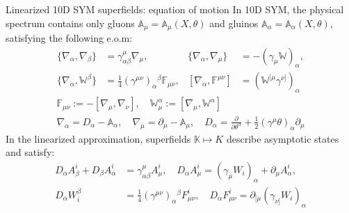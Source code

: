 \documentclass{beamer}
\begin{document}
\begin{frame}{Linearized 10D SYM superfields: equation of motion}\label{10d sym}
	In 10D SYM, the physical spectrum contains only gluons 
	$\mathbb{A}_\mu=\mathbb{A}_\mu(X,\theta)$ and gluinos 
	$\mathbb{A}_\alpha=\mathbb{A}_\alpha(X,\theta)$, satisfying the following e.o.m:
	\begin{equation*}
		\begin{aligned}
			\{\nabla_{\alpha},\nabla_{\beta}\}&=\gamma_{\alpha\beta}^{\mu}\nabla_{\mu},&\{\nabla_{\alpha},\nabla_{\mu}\}&=-(\gamma_{\mu}\mathbb{W})_{\alpha},\\
			\{\nabla_{\alpha},\mathbb{W}^{\beta}\}&=\frac{1}{4}(\gamma^{\mu\nu})_\alpha{}^\beta\mathbb{F}_{\mu\nu},&[\nabla_\alpha,\mathbb{F}^{\mu\nu}]&=(\mathbb{W}^{[\mu}\gamma^{\nu]})_\alpha
		\end{aligned}
	\end{equation*}
	\begin{equation*}
		\begin{gathered}
			\mathbb{F}_{\mu\nu}:=-\left[\nabla_\mu,\nabla_\nu\right],\quad\mathbb{W}_\mu^\alpha:=\left[\nabla_\mu,\mathbb{W}^\alpha\right]\\
			\nabla_{\alpha}=D_{\alpha}-\mathbb{A}_{\alpha},\quad\nabla_{\mu}=\partial_{\mu}-\mathbb{A}_{\mu},\quad D_{\alpha}=\frac{\partial}{\partial\theta^{\alpha}}+\frac{1}{2}(\gamma^{\mu}\theta)_{\alpha}\partial_{\mu}
		\end{gathered}
	\end{equation*}
	In the linearized approximation, superfields $\mathbb{K}\mapsto K$ describe asymptotic states and satisfy:
	\begin{equation*}
		\begin{aligned}
			D_{\alpha}A_{\beta}^{i}+D_{\beta}A_{\alpha}^{i}&=\gamma_{\alpha\beta}^{\mu}A_{\mu}^{i},\quad D_{\alpha}A_{\mu}^{i}=(\gamma_{\mu}W_{i})_{\alpha}+\partial_{\mu}A_{\alpha}^{i},\\D_{\alpha}W_{i}^{\beta}&=\frac{1}{4}(\gamma^{\mu\nu})_{\alpha}{}^{\beta}F_{\mu\nu}^{i},\quad D_{\alpha}F_{\mu\nu}^{i}=\partial_{[\mu}(\gamma_{\nu]}W_{i})_{\alpha}
		\end{aligned}
	\end{equation*}
\end{frame}
\end{document}
